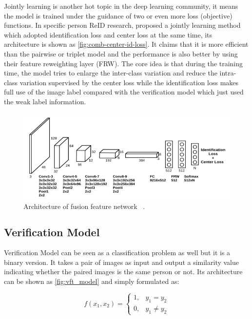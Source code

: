 Jointly learning is another hot topic in the deep learning community, it means the model is trained under
the guidance of two or even more loss (objective) functions. In specific person 
ReID research, \cite{comb-id-and-center-loss-2017} proposed a jointly learning 
method which adopted identification loss and center loss 
\cite{center-loss-2016} at the same time, its architecture is shown as
\autoref{fig:comb-center-id-loss}. It claims that it is more efficient than the
pairwise or triplet model and the performance is also better by using their 
feature reweighting layer (FRW). The core idea is that during the training 
time, the model tries to enlarge the inter-class variation
and reduce the intra-class variation supervised by the center loss while
the identification loss makes full use of the image label compared with the 
verification model which just used the weak label information.

\begin{figure}
    \includegraphics[width=\linewidth]{figures/comb-center-id-loss.png}
    \caption{Architecture of fusion feature network 
        ~\protect\cite{comb-id-and-center-loss-2017}.}
    \label{fig:comb-center-id-loss}
\end{figure}

\subsection{Verification Model}

Verification Model can be seen as a classification problem as well but it is a 
binary version. It takes a pair of images as input and output a similarity 
value indicating whether the paired images is the same person or not. Its 
architecture can be shown as \autoref{fig:vft_model} and simply formulated as:

$$
f(x_1, x_2) =
\begin{cases}
1,&  y_1 = y_2 \\
0,&  y_1 \neq y_2
\end{cases}
$$

